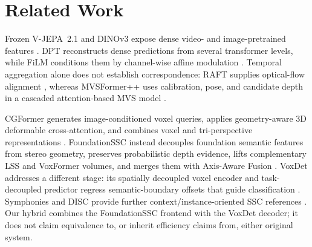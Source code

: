 \section{Related Work}
\label{sec:related}

Frozen V-JEPA~2.1 and DINOv3 expose dense video- and image-pretrained features \cite{murlabadia2026vjepa21,simeoni2025dinov3}. DPT reconstructs dense predictions from several transformer levels, while FiLM conditions them by channel-wise affine modulation \cite{ranftl2021dpt,perez2018film}. Temporal aggregation alone does not establish correspondence: RAFT supplies optical-flow alignment \cite{teed2020raft,meister2018unflow}, whereas MVSFormer++ uses calibration, pose, and candidate depth in a cascaded attention-based MVS model \cite{cao2024mvsformerpp}.

CGFormer generates image-conditioned voxel queries, applies geometry-aware 3D deformable cross-attention, and combines voxel and tri-perspective representations \cite{yu2024cgformer}. FoundationSSC instead decouples foundation semantic features from stereo geometry, preserves probabilistic depth evidence, lifts complementary LSS and VoxFormer volumes, and merges them with Axis-Aware Fusion \cite{chen2025foundationssc,li2023voxformer}. VoxDet addresses a different stage: its spatially decoupled voxel encoder and task-decoupled predictor regress semantic-boundary offsets that guide classification \cite{li2025voxdet}. Symphonies and DISC provide further context/instance-oriented SSC references \cite{jiang2024symphonies,liu2025disc}. Our hybrid combines the FoundationSSC frontend with the VoxDet decoder; it does not claim equivalence to, or inherit efficiency claims from, either original system.
